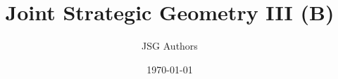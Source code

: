 \documentclass[11pt]{article}
\title{Joint Strategic Geometry III (B)}
\author{JSG Authors}
\date{\today}
\begin{document}
\maketitle

\newcommand{\JSGWrap}{B}
















\nocite{*}
\printbibliography
\end{document}
